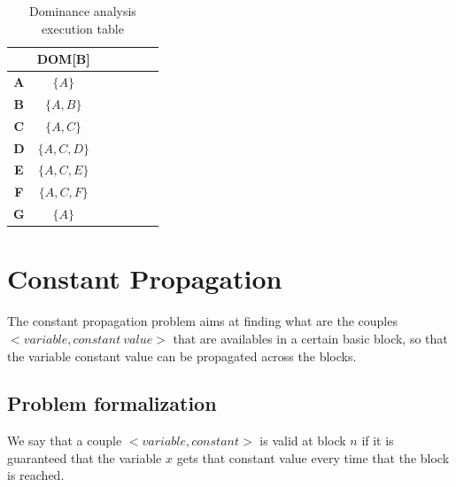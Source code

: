 \documentclass{article}
\begin{document}
\begin{table}[H]
	\centering
	\begin{tabular}{|c|c|c|c|c|c|c|}
		\hline
		           & \textbf{DOM[B]} \\ \hline
		\textbf{A} & $\{A\}$         \\ \hline
		\textbf{B} & $\{A, B\}$      \\ \hline
		\textbf{C} & $\{A, C\}$      \\ \hline
		\textbf{D} & $\{A, C, D\}$   \\ \hline
		\textbf{E} & $\{A, C, E\}$   \\ \hline
		\textbf{F} & $\{A, C, F\}$   \\ \hline
		\textbf{G} & $\{A\}$         \\ \hline
	\end{tabular}
	\caption{Dominance analysis execution table}
\end{table}

\section{Constant Propagation}

The constant propagation problem aims at finding what are the couples $<variable, constant \ value>$ that are availables in a certain basic block, so that the variable constant value can be propagated across the blocks.

\subsection{Problem formalization}

We say that a couple $<variable, constant>$ is valid at block $n$ if it is guaranteed that the variable $x$ gets that constant value every time that the block is reached.
\end{document}
